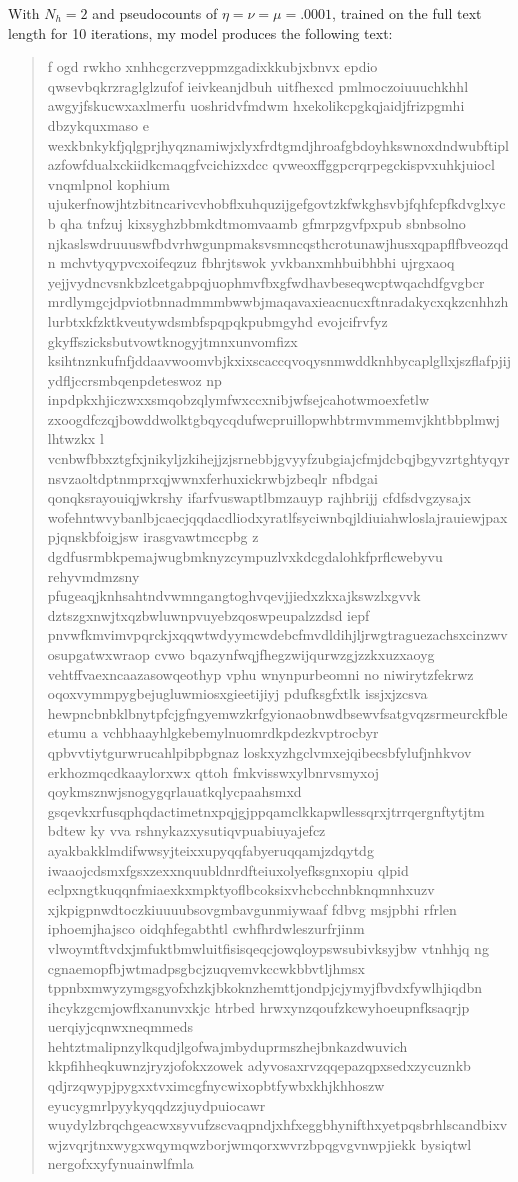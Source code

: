 \documentclass{article}
\begin{document}
\begin{enumerate}[(a)]
With $N_h = 2$ and pseudocounts of $\eta=\nu=\mu=.0001$, trained on the full text
length for 10 iterations, my model produces the following text:

\begin{quote}
f ogd rwkho xnhhcgcrzveppmzgadixkkubjxbnvx epdio qwsevbqkrzraglglzufof ieivkeanjdbuh uitfhexcd pmlmoczoiuuuchkhhl awgyjfskucwxaxlmerfu uoshridvfmdwm hxekolikcpgkqjaidjfrizpgmhi dbzykquxmaso e wexkbnkykfjqlgprjhyqznamiwjxlyxfrdtgmdjhroafgbdoyhkswnoxdndwubftiplazfowfdualxckiidkcmaqgfvcichizxdcc qvweoxffggpcrqrpegckispvxuhkjuiocl vnqmlpnol kophium ujukerfnowjhtzbitncarivcvhobflxuhquzijgefgovtzkfwkghsvbjfqhfcpfkdvglxycb   qha tnfzuj kixsyghzbbmkdtmomvaamb gfmrpzgvfpxpub sbnbsolno njkaslswdruuuswfbdvrhwgunpmaksvsmncqsthcrotunawjhusxqpapflfbveozqdn mchvtyqypvcxoifeqzuz fbhrjtswok yvkbanxmhbuibhbhi ujrgxaoq yejjvydncvsnkbzlcetgabpqjuophmvfbxgfwdhavbeseqwcptwqachdfgvgbcr mrdlymgcjdpviotbnnadmmmbwwbjmaqavaxieacnucxftnradakycxqkzcnhhzhlurbtxkfzktkveutywdsmbfspqpqkpubmgyhd evojcifrvfyz gkyffszicksbutvowtknogyjtmnxunvomfizx ksihtnznkufnfjddaavwoomvbjkxixscaccqvoqysnmwddknhbycaplgllxjszflafpjijydfljccrsmbqenpdeteswoz np inpdpkxhjiczwxxsmqobzqlymfwxccxnibjwfsejcahotwmoexfetlw zxoogdfczqjbowddwolktgbqycqdufwcpruillopwhbtrmvmmemvjkhtbbplmwj lhtwzkx l vcnbwfbbxztgfxjnikyljzkihejjzjsrnebbjgvyyfzubgiajcfmjdcbqjbgyvzrtghtyqyrnsvzaoltdptnmprxqjwwnxferhuxickrwbjzbeqlr nfbdgai qonqksrayouiqjwkrshy ifarfvuswaptlbmzauyp rajhbrijj cfdfsdvgzysajx wofehntwvybanlbjcaecjqqdacdliodxyratlfsyciwnbqjldiuiahwloslajrauiewjpaxpjqnskbfoigjsw irasgvawtmccpbg  z dgdfusrmbkpemajwugbmknyzcympuzlvxkdcgdalohkfprflcwebyvu rehyvmdmzsny pfugeaqjknhsahtndvwmngangtoghvqevjjiedxzkxajkswzlxgvvk dztszgxnwjtxqzbwluwnpvuyebzqoswpeupalzzdsd iepf pnvwfkmvimvpqrckjxqqwtwdyymcwdebcfmvdldihjljrwgtraguezachsxcinzwvosupgatwxwraop cvwo bqazynfwqjfhegzwijqurwzgjzzkxuzxaoyg vehtffvaexncaazasowqeothyp vphu wnynpurbeomni no niwirytzfekrwz oqoxvymmpygbejugluwmiosxgieetijiyj pdufksgfxtlk issjxjzcsva hewpncbnbklbnytpfcjgfngyemwzkrfgyionaobnwdbsewvfsatgvqzsrmeurckfbleetumu a vchbhaayhlgkebemylnuomrdkpdezkvptrocbyr qpbvvtiytgurwrucahlpibpbgnaz loskxyzhgclvmxejqibecsbfylufjnhkvov erkhozmqcdkaaylorxwx qttoh fmkvisswxylbnrvsmyxoj qoykmsznwjsnogygqrlauatkqlycpaahsmxd gsqevkxrfusqphqdactimetnxpqjgjppqamclkkapwllessqrxjtrrqergnftytjtm bdtew ky vva  rshnykazxysutiqvpuabiuyajefcz ayakbakklmdifwwsyjteixxupyqqfabyeruqqamjzdqytdg iwaaojcdsmxfgsxzexxnquubldnrdfteiuxolyefksgnxopiu qlpid  eclpxngtkuqqnfmiaexkxmpktyoflbcoksixvhcbcchnbknqmnhxuzv xjkpigpnwdtoczkiuuuubsovgmbavgunmiywaaf fdbvg msjpbhi rfrlen iphoemjhajsco oidqhfegabthtl cwhfhrdwleszurfrjinm vlwoymtftvdxjmfuktbmwluitfisisqeqcjowqloypswsubivksyjbw vtnhhjq ng cgnaemopfbjwtmadpsgbcjzuqvemvkccwkbbvtljhmsx tppnbxmwyzymgsgyofxhzkjbkoknzhemttjondpjcjymyjfbvdxfywlhjiqdbn ihcykzgcmjowflxanunvxkjc htrbed hrwxynzqoufzkcwyhoeupnfksaqrjp uerqiyjcqnwxneqmmeds hehtztmalipnzylkqudjlgofwajmbyduprmszhejbnkazdwuvich kkpfihheqkuwnzjryzjofokxzowek adyvosaxrvzqqepazqpxsedxzycuznkb qdjrzqwypjpygxxtvximcgfnycwixopbtfywbxkhjkhhoszw eyucygmrlpyykyqqdzzjuydpuiocawr wuydylzbrqchgeacwxsyvufzscvaqpndjxhfxeggbhynifthxyetpqsbrhlscandbixvwjzvqrjtnxwygxwqymqwzborjwmqorxwvrzbpqgvgvnwpjiekk bysiqtwl nergofxxyfynuainwlfmla 
\end{quote}
\end{enumerate}
\end{document}
